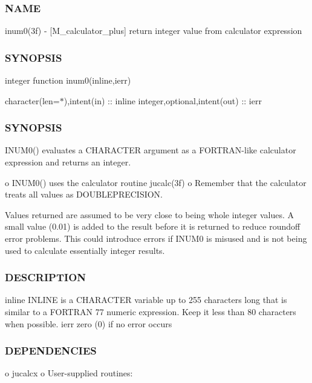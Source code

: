 \subsubsection*{N\+A\+ME}

inum0(3f) -\/ \mbox{[}M\+\_\+calculator\+\_\+plus\mbox{]} return integer value from calculator expression \subsubsection*{S\+Y\+N\+O\+P\+S\+IS}

integer function inum0(inline,ierr)

character(len=$\ast$),intent(in) \+:\+: inline integer,optional,intent(out) \+:\+: ierr

\subsubsection*{S\+Y\+N\+O\+P\+S\+IS}

\begin{DoxyVerb}INUM0() evaluates a CHARACTER argument as a FORTRAN-like
calculator expression and returns an integer.

 o INUM0() uses the calculator routine jucalc(3f)
 o Remember that the calculator treats all values as DOUBLEPRECISION.

Values returned are assumed to be very close to being whole integer
values.  A small value (0.01) is added to the result before it is
returned to reduce roundoff error problems. This could introduce
errors if INUM0 is misused and is not being used to calculate
essentially integer results.
\end{DoxyVerb}
 \subsubsection*{D\+E\+S\+C\+R\+I\+P\+T\+I\+ON}

\begin{DoxyVerb}inline  INLINE is a CHARACTER variable up to 255 characters long that is
        similar to a FORTRAN 77 numeric expression. Keep it less than 80
        characters when possible.
ierr    zero (0) if no error occurs
\end{DoxyVerb}


\subsubsection*{D\+E\+P\+E\+N\+D\+E\+N\+C\+I\+ES}

o jucalcx o User-\/supplied routines\+:

